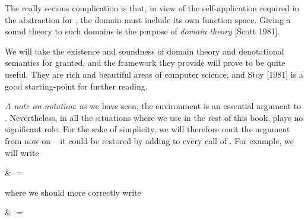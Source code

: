 
\noindent The
really serious complication is that, in view of the self-application required in
the \tl{} abstraction for , the domain must include its own function space. Giving a sound theory to such domains is the purpose of \textit{domain theory} [Scott 1981].

We will take the existence and soundness of domain theory and denotational semantics for granted, and the framework they provide will prove to be
quite useful. They are rich and beautiful areas of computer science, and Stoy
[1981] is a good starting-point for further reading.

\textit{A note on notation}: as we have seen, the environment \tr{} is an essential
argument to \eval{}. Nevertheless, in all the situations where we use \eval{} in the
rest of this book, \tr{} plays no significant role. For the sake of simplicity, we will
therefore omit the argument \tr{} from now on -- it could be restored by adding \tr{}
to every call of \eval{}. For example, we will write

\begin{mlalign}
     & $=$ 
\end{mlalign}

where we should more correctly write

\begin{mlalign}
     \tr{} & $=$  \tr{}
\end{mlalign}

